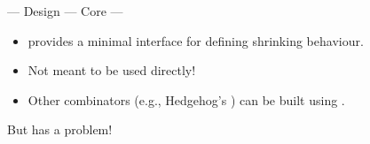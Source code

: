 \begin{frame}[fragile,t]{\halcheck{} --- Design --- Core --- }
  \begin{itemize}
    \item {} provides a minimal interface for defining shrinking behaviour.
    \item Not meant to be used directly!
    \item Other combinators (e.g., Hedgehog's ) can be built using .
  \end{itemize}

  \begin{center}
    But  has a problem!
  \end{center}
\end{frame}


